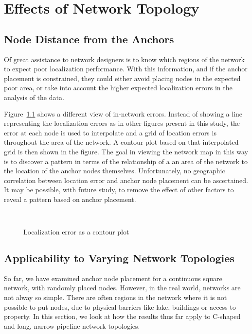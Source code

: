 \chapter{Effects of Network Topology}

\section{Node Distance from the Anchors}

Of great assistance to network designers is to know which regions of the network to expect poor localization performance.  With this information, and if the anchor placement is constrained, they could either avoid placing nodes in the expected poor area, or take into account the higher expected localization errors in the analysis of the data.

Figure~\ref{fig:AS6goodcontour} shows a different view of in-network errors. Instead of showing a line representing the localization errors as in other figures present in this study, the error at each node is used to interpolate and a grid of location errors is throughout the area of the network.  A contour plot based on that interpolated grid is then shown in the figure.  The goal in viewing the network map in this way is to discover a pattern in terms of the relationship of a an area of the network to the location of the anchor nodes themselves.  Unfortunately, no geographic correlation between location error and anchor node placement can be ascertained.  It may be possible, with future study, to remove the effect of other factors to reveal a pattern based on anchor placement.

\begin{figure}
  \centering
	\\
	\caption{Localization error as a contour plot}
	\label{fig:AS6goodcontour}
\end{figure}


\section{Applicability to Varying Network Topologies}

So far, we have examined anchor node placement for a continuous square network, with randomly placed nodes.  However, in the real world, networks are not alway so simple.  There are often regions in the network where it is not possible to put nodes, due to physical barriers like lake, buildings or access to property.  In this section, we look at how the results thus far apply to C-shaped and long, narrow pipeline network topologies.

